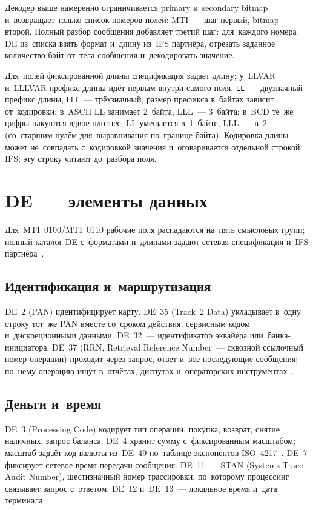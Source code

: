 Декодер выше намеренно ограничивается primary и~secondary bitmap и~возвращает
только список номеров полей: MTI~--- шаг первый, bitmap~--- второй. Полный
разбор сообщения добавляет третий шаг: для~каждого номера DE из~списка взять
формат и~длину из~IFS партнёра, отрезать заданное количество байт от~тела
сообщения и~декодировать значение.

Для~полей фиксированной длины спецификация задаёт длину; у~LLVAR и~LLLVAR
префикс длины идёт первым внутри самого поля. \texttt{LL}~--- двузначный
префикс длины, \texttt{LLL}~--- трёхзначный; размер префикса в~байтах зависит
от~кодировки: в~ASCII LL занимает 2~байта, LLL~--- 3~байта; в~BCD те~же цифры
пакуются вдвое плотнее, LL умещается в~1~байте, LLL~--- в~2 (со~старшим нулём
для~выравнивания по~границе байта). Кодировка длины может не~совпадать
с~кодировкой значения и~оговаривается отдельной строкой IFS; эту строку читают
до~разбора поля.

\section{DE~--- элементы данных}\label{sec:iso8583-data-elements}

Для~MTI~0100/MTI~0110 рабочие поля распадаются на~пять смысловых групп;
полный каталог DE с~форматами и~длинами задают сетевая спецификация и~IFS
партнёра~\cite{fis-iso8583-guide-2023}.

\subsection*{Идентификация и~маршрутизация}

DE~2 (PAN) идентифицирует карту. DE~35 (Track~2 Data) укладывает в~одну
строку тот~же PAN вместе со~сроком действия, сервисным кодом и~дискреционными
данными. DE~32~--- идентификатор эквайера или~банка-инициатора. DE~37 (RRN,
Retrieval Reference Number~--- сквозной ссылочный номер операции) проходит
через запрос, ответ и~все последующие сообщения; по~нему операцию ищут
в~отчётах, диспутах и~операторских инструментах~\cite{fis-iso8583-guide-2023}.

\subsection*{Деньги и~время}

DE~3 (Processing Code) кодирует тип операции: покупка, возврат, снятие
наличных, запрос баланса. DE~4 хранит сумму с~фиксированным масштабом; масштаб
задаёт код валюты из~DE~49 по~таблице экспонентов ISO~4217~\cite{iso-4217}. DE~7 фиксирует
сетевое время передачи сообщения. DE~11~--- STAN (Systems Trace Audit Number),
шестизначный номер трассировки, по~которому процессинг связывает запрос
с~ответом. DE~12 и~DE~13~--- локальное время и~дата терминала.

